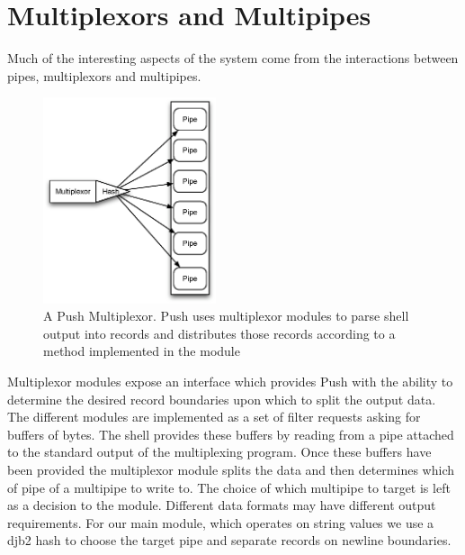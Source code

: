 \documentclass[10pt,conference,letterpaper]{IEEEtran}
\begin{document}
\section{Multiplexors and Multipipes}
Much of the interesting aspects of the system come from the interactions between pipes, multiplexors and multipipes.


\begin{figure}[htp]
\centering
\includegraphics[width=2.0in]{mux.eps}
\caption{A Push Multiplexor. Push uses multiplexor modules to parse shell output into records and distributes those records according to a method implemented in the module}\label{fig:mux}
\end{figure}
Multiplexor modules expose an interface which provides Push with the ability to determine the desired record boundaries upon which to split the output data. The different modules are implemented as a set of filter requests asking for buffers of bytes. The shell provides these buffers by reading from a pipe attached to the standard output of the multiplexing program. Once these buffers have been provided the multiplexor module splits the data and then determines which of pipe of a multipipe to write to. The choice of which multipipe to target is left as a decision to the module. Different data formats may have different output requirements. For our main module, which operates on string values we use a djb2 hash to choose the target pipe and separate records on newline boundaries.
\end{document}
